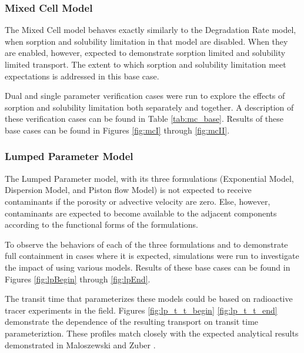 \subsubsection{Mixed Cell Model}
The Mixed Cell model behaves exactly similarly to the Degradation Rate 
model, when sorption and solubility limitation in that model are disabled. When they are 
enabled, however, expected to demonstrate sorption limited and solubility 
limited transport. The extent to which sorption and solubility limitation meet 
expectations is addressed in this base case.

Dual and single parameter verification cases were run to explore the effects of sorption and 
solubility limitation both separately and together. A description of these verification 
cases can be found in Table \ref{tab:mc_base}. 
Results of these base cases can be found in Figures \ref{fig:mcI} through 
\ref{fig:mcII}.



\FloatBarrier

\subsubsection{Lumped Parameter Model}
The Lumped Parameter model, with its three formulations (Exponential Model, 
Dispersion Model, and Piston flow Model) is not expected to receive 
contaminants if the porosity or advective velocity are zero. Else, however, 
contaminants are expected to  become available to the adjacent components 
according to the functional forms of the formulations. 

To observe the behaviors of each of the three formulations and to demonstrate 
full containment in cases where it is expected, simulations were run to 
investigate the impact of using various models. Results of these base cases can be found in Figures 
\ref{fig:lpBegin} through \ref{fig:lpEnd}.



The transit time that parameterizes these models could be based on radioactive 
tracer experiments in the field. Figures \ref{fig:lp_t_t_begin} 
\ref{fig:lp_t_t_end} demonstrate the dependence of the resulting transport on 
transit time parameteriztion. These profiles match closely with the expected 
analytical results demonstrated in Maloszewski and Zuber 
\cite{zuber_lumped_1985}.



